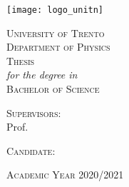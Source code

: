 
\graphicspath{{Frontmatter/figures/PNG/}{Frontmatter/figures/PDF/}{Frontmatter/figures/}}

\begin{titlepage}
	
	\begin{center}
	
		\texttt{[image: logo\_unitn]}\\[0.4cm]
			
		\vspace{0.8cm}
		
		{ \Huge \scshape University of Trento }\\[0.25cm]
		{ \Large \scshape Department of Physics }\\[2cm]

		{ \Large \scshape Thesis }\\[0.05cm]
		{ \itshape for the degree in }\\[0.05cm]
		{ \Large \scshape Bachelor of Science }\\[2cm]
		
		
		{ \huge \bfseries \THtitle }
		
		\vfill
				
		\begin{minipage}[t]{0.45\textwidth}
			\begin{flushleft} %
				{ \large \scshape Supervisors: } \\[0.25cm]
				{ Prof. \THsupervisor }\\[0.10cm]
			\end{flushleft}
		\end{minipage}
		\begin{minipage}[t]{0.45\textwidth}
			\begin{flushright} %
				{ \large \scshape Candidate: }\\[0.25cm]
				{ \THauthor }
			\end{flushright}
		\end{minipage}
		
		\vspace{2cm}
		
		{\large \scshape Academic Year 2020/2021}
		
	\end{center}
	
	\restoregeometry
\end{titlepage}